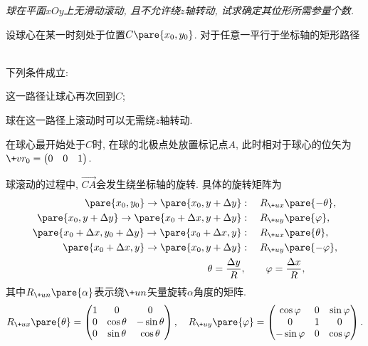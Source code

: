 \documentclass{ctexart}
\begin{document}
\noindent
\textit{球在平面$xOy$上无滑动滚动, 且不允许绕$z$轴转动, 试求确定其位形所需参量个数.}

\begin{cenum}
    \item 设球心在某一时刻处于位置$C\pare{x_0,y_0}$. 对于任意一平行于坐标轴的矩形路径\\
    \centerline{}\\
    下列条件成立:
    \begin{cenum}
        \item 这一路径让球心再次回到$C$;
        \item 球在这一路径上滚动时可以无需绕$z$轴转动.
    \end{cenum}
    \item 在球心最开始处于$C$时, 在球的北极点处放置标记点$A$, 此时相对于球心的位矢为$\+vr_0 = \begin{pmatrix}
        0 & 0 & 1
    \end{pmatrix}$.
    \item 球滚动的过程中, $\overrightarrow{CA}$会发生绕坐标轴的旋转. 具体的旋转矩阵为
    \begin{align*}
        \pare{x_0,y_0}\rightarrow \pare{x_0,y+\Delta y}&:\quad R_{\+ux}\pare{-\theta},\\
        \pare{x_0,y+\Delta y}\rightarrow \pare{x_0+\Delta x,y+\Delta y}&:\quad R_{\+uy}\pare{\varphi},\\
        \pare{x_0+\Delta x,y_0+\Delta y}\rightarrow \pare{x_0+\Delta x,y}&:\quad R_{\+ux}\pare{\theta},\\
        \pare{x_0+\Delta x,y}\rightarrow \pare{x_0,y+\Delta y}&:\quad R_{\+uy}\pare{-\varphi},\\
        \quad \theta = \frac{\Delta y}{R}&,\quad \quad \varphi = \frac{\Delta x}{R},
    \end{align*}
    其中$R_{\+un}\pare{\alpha}$表示绕$\+un$矢量旋转$\alpha$角度的矩阵.
    \[ R_{\+ux}\pare{\theta} = \begin{pmatrix}
        1 & 0 & 0\\
        0 & \cos\theta & -\sin\theta \\
        0 & \sin\theta & \cos\theta
    \end{pmatrix},\quad R_{\+uy}\pare{\varphi} = \begin{pmatrix}
        \cos\varphi & 0 & \sin\varphi\\
        0 & 1 & 0 \\
        -\sin\varphi & 0 & \cos\varphi
    \end{pmatrix}. \]

\end{cenum}
\end{document}
